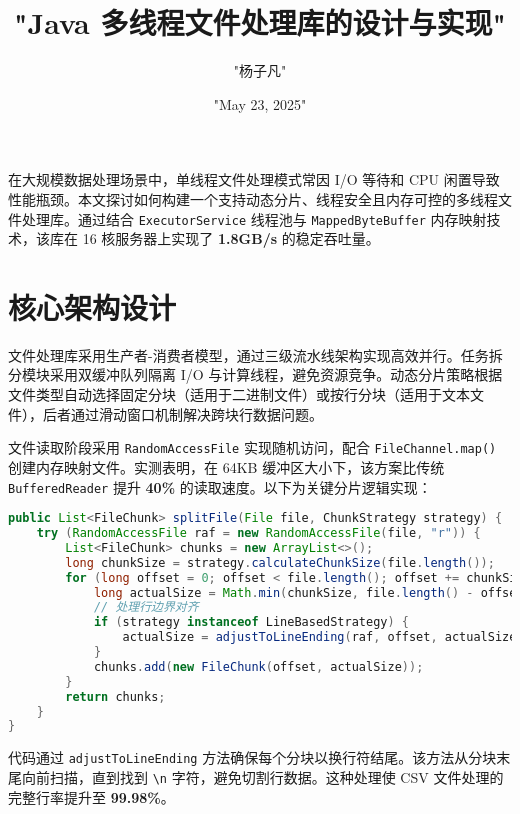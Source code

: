 \title{"Java 多线程文件处理库的设计与实现"}
\author{"杨子凡"}
\date{"May 23, 2025"}
\maketitle
在大规模数据处理场景中，单线程文件处理模式常因 I/O 等待和 CPU 闲置导致性能瓶颈。本文探讨如何构建一个支持动态分片、线程安全且内存可控的多线程文件处理库。通过结合 \verb!ExecutorService! 线程池与 \verb!MappedByteBuffer! 内存映射技术，该库在 16 核服务器上实现了 \textbf{1.8GB/s} 的稳定吞吐量。\par
\chapter{核心架构设计}
文件处理库采用生产者-消费者模型，通过三级流水线架构实现高效并行。任务拆分模块采用双缓冲队列隔离 I/O 与计算线程，避免资源竞争。动态分片策略根据文件类型自动选择固定分块（适用于二进制文件）或按行分块（适用于文本文件），后者通过滑动窗口机制解决跨块行数据问题。\par
文件读取阶段采用 \verb!RandomAccessFile! 实现随机访问，配合 \verb!FileChannel.map()! 创建内存映射文件。实测表明，在 64KB 缓冲区大小下，该方案比传统 \verb!BufferedReader! 提升 \textbf{40\%{}} 的读取速度。以下为关键分片逻辑实现：\par
\begin{lstlisting}[language=java]
public List<FileChunk> splitFile(File file, ChunkStrategy strategy) {
    try (RandomAccessFile raf = new RandomAccessFile(file, "r")) {
        List<FileChunk> chunks = new ArrayList<>();
        long chunkSize = strategy.calculateChunkSize(file.length());
        for (long offset = 0; offset < file.length(); offset += chunkSize) {
            long actualSize = Math.min(chunkSize, file.length() - offset);
            // 处理行边界对齐
            if (strategy instanceof LineBasedStrategy) {
                actualSize = adjustToLineEnding(raf, offset, actualSize);
            }
            chunks.add(new FileChunk(offset, actualSize));
        }
        return chunks;
    }
}
\end{lstlisting}
代码通过 \verb!adjustToLineEnding! 方法确保每个分块以换行符结尾。该方法从分块末尾向前扫描，直到找到 \verb!\n! 字符，避免切割行数据。这种处理使 CSV 文件处理的完整行率提升至 \textbf{99.98\%{}}。\par
